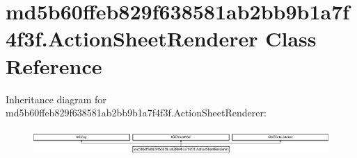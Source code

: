 \hypertarget{classmd5b60ffeb829f638581ab2bb9b1a7f4f3f_1_1ActionSheetRenderer}{}\section{md5b60ffeb829f638581ab2bb9b1a7f4f3f.\+Action\+Sheet\+Renderer Class Reference}
\label{classmd5b60ffeb829f638581ab2bb9b1a7f4f3f_1_1ActionSheetRenderer}
Inheritance diagram for md5b60ffeb829f638581ab2bb9b1a7f4f3f.\+Action\+Sheet\+Renderer\+:\begin{figure}[H]
\begin{center}
\leavevmode
\includegraphics[height=0.998218cm]{classmd5b60ffeb829f638581ab2bb9b1a7f4f3f_1_1ActionSheetRenderer}
\end{center}
\end{figure}
